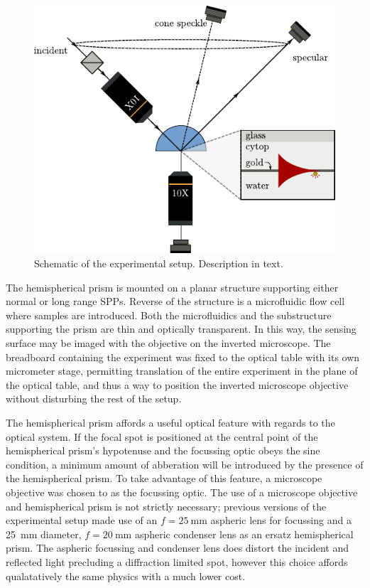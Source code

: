 \begin{figure}[ht]
\centering
 \includegraphics[keepaspectratio]{experimental/figures/conefig.pdf}
 \caption{Schematic of the experimental setup.  Description in text.}
\label{fig:experimentalsetup}
\end{figure}

The hemispherical prism is mounted on a planar structure supporting either
normal or long range SPPs.  Reverse of the structure is a microfluidic flow
cell where samples are introduced.  Both the microfluidics and the
substructure supporting the prism are thin and optically transparent.  In
this way, the sensing surface may be imaged with the objective on the
inverted microscope.  The breadboard containing the experiment was fixed to
the optical table with its own micrometer stage, permitting translation of
the entire experiment in the plane of the optical table, and thus a way to
position the inverted microscope objective without disturbing the rest of
the setup.

The hemispherical prism affords a useful optical feature with regards to the
optical system.  If the focal spot is positioned at the central point of the
hemispherical prism's hypotenuse and the focussing optic obeys the sine
condition, a minimum amount of abberation will be introduced by the presence
of the hemispherical prism.  To take advantage of this feature, a microscope
objective was chosen to as the focussing optic.  The use of a microscope
objective and hemispherical prism is not strictly necessary; previous versions
of the experimental setup made use of an $f=\SI{25}{\milli\meter}$ aspheric
lens for focussing and a \SI{25}{\milli\meter} diameter,
$f=\SI{20}{\milli\meter}$ aspheric condenser lens as an ersatz hemispherical
prism.  The aspheric focussing and condenser lens does distort the incident
and reflected light precluding a diffraction limited spot, however this choice
affords qualatatively the same physics with a much lower cost.

